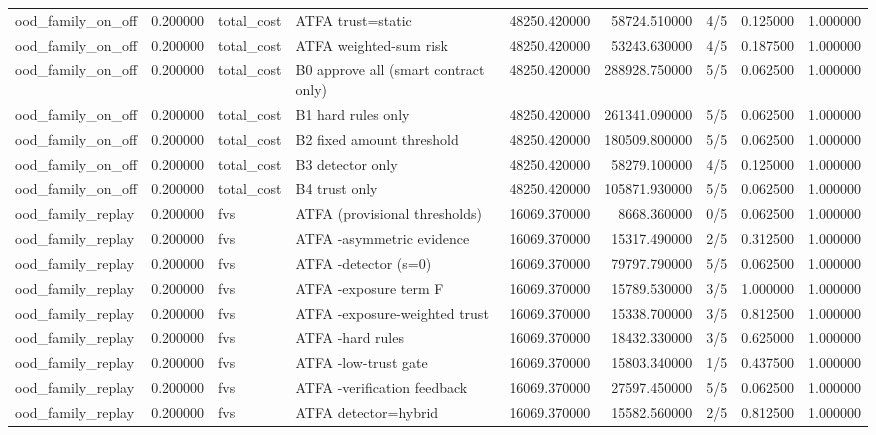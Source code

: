 \begin{tabular}{lrllrrlrr}
ood\_family\_on\_off & 0.200000 & total\_cost & ATFA trust=static & 48250.420000 & 58724.510000 & 4/5 & 0.125000 & 1.000000 \\
ood\_family\_on\_off & 0.200000 & total\_cost & ATFA weighted-sum risk & 48250.420000 & 53243.630000 & 4/5 & 0.187500 & 1.000000 \\
ood\_family\_on\_off & 0.200000 & total\_cost & B0 approve all (smart contract only) & 48250.420000 & 288928.750000 & 5/5 & 0.062500 & 1.000000 \\
ood\_family\_on\_off & 0.200000 & total\_cost & B1 hard rules only & 48250.420000 & 261341.090000 & 5/5 & 0.062500 & 1.000000 \\
ood\_family\_on\_off & 0.200000 & total\_cost & B2 fixed amount threshold & 48250.420000 & 180509.800000 & 5/5 & 0.062500 & 1.000000 \\
ood\_family\_on\_off & 0.200000 & total\_cost & B3 detector only & 48250.420000 & 58279.100000 & 4/5 & 0.125000 & 1.000000 \\
ood\_family\_on\_off & 0.200000 & total\_cost & B4 trust only & 48250.420000 & 105871.930000 & 5/5 & 0.062500 & 1.000000 \\
ood\_family\_replay & 0.200000 & fvs & ATFA (provisional thresholds) & 16069.370000 & 8668.360000 & 0/5 & 0.062500 & 1.000000 \\
ood\_family\_replay & 0.200000 & fvs & ATFA -asymmetric evidence & 16069.370000 & 15317.490000 & 2/5 & 0.312500 & 1.000000 \\
ood\_family\_replay & 0.200000 & fvs & ATFA -detector (s=0) & 16069.370000 & 79797.790000 & 5/5 & 0.062500 & 1.000000 \\
ood\_family\_replay & 0.200000 & fvs & ATFA -exposure term F & 16069.370000 & 15789.530000 & 3/5 & 1.000000 & 1.000000 \\
ood\_family\_replay & 0.200000 & fvs & ATFA -exposure-weighted trust & 16069.370000 & 15338.700000 & 3/5 & 0.812500 & 1.000000 \\
ood\_family\_replay & 0.200000 & fvs & ATFA -hard rules & 16069.370000 & 18432.330000 & 3/5 & 0.625000 & 1.000000 \\
ood\_family\_replay & 0.200000 & fvs & ATFA -low-trust gate & 16069.370000 & 15803.340000 & 1/5 & 0.437500 & 1.000000 \\
ood\_family\_replay & 0.200000 & fvs & ATFA -verification feedback & 16069.370000 & 27597.450000 & 5/5 & 0.062500 & 1.000000 \\
ood\_family\_replay & 0.200000 & fvs & ATFA detector=hybrid & 16069.370000 & 15582.560000 & 2/5 & 0.812500 & 1.000000 \\

\end{tabular}
